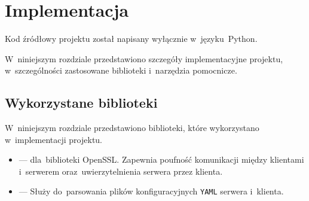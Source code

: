 \documentclass[thesis]{subfiles}
\begin{document}
\chapter{Implementacja}

Kod źródłowy projektu został napisany wyłącznie w~języku~Python.

W~niniejszym rozdziale przedstawiono szczegóły implementacyjne projektu, w~szczególności zastosowane biblioteki i~narzędzia pomocnicze.


\section{Wykorzystane biblioteki}

W~niniejszym rozdziale przedstawiono biblioteki, które wykorzystano w~implementacji projektu.

\begin{itemize}
	\item {} ---  dla~biblioteki OpenSSL. Zapewnia poufność komunikacji między klientami i~serwerem oraz~uwierzytelnienia serwera przez klienta.
	\item {} --- Służy do~parsowania plików konfiguracyjnych \texttt{YAML} serwera i~klienta.
\end{itemize}
\end{document}

